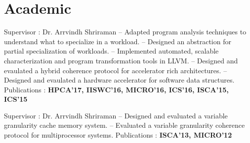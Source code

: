 
\section{Academic}
{Supervisor : Dr. Arrvindh Shriraman \newline{} 
-- Adapted program analysis techniques to understand what to specialize in a workload. \newline{}
-- Designed an abstraction for partial specialization of workloads. \newline{}
-- Implemented automated, scalable characterization and program transformation tools in LLVM. \newline{}
-- Designed and evaulated a hybrid coherence protocol for accelerator rich architectures. \newline{}
-- Designed and evaulated a hardware accelerator for software data structures. \newline{}
Publications : \textbf{HPCA'17, IISWC'16, MICRO'16, ICS'16, ISCA'15, ICS'15}}

\vspace{9pt}

{Supervisor : Dr. Arrvindh Shriraman \newline{} 
-- Designed and evaluated a variable granularity cache memory system. \newline{}
-- Evaluated a variable granularity coherence protocol for multiprocessor systems. \newline{}
Publications : \textbf{ISCA'13, MICRO'12}}

\vspace{9pt}



